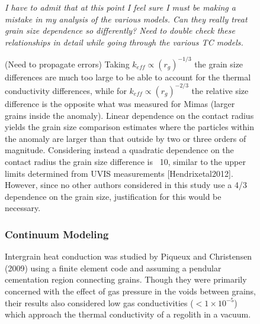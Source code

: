 \documentclass[11pt]{article} %
\begin{document}
\begin{figure}[ht]
	\emph{I have to admit that at this point I feel sure I must be making a mistake in my analysis of the various models. Can they really treat grain size dependence so differently? Need to double check these relationships in detail while going through the various TC models.}
	
	
	
	(Need to propagate errors) Taking $k_{eff} \varpropto (r_{g})^{-1/3}$ the grain size differences are much too large to be able to account for the thermal conductivity differences, while for $k_{eff} \varpropto (r_{g})^{-2/3}$ the relative size difference is the opposite what was measured for Mimas (larger grains inside the anomaly). Linear dependence on the contact radius yields the grain size comparison estimates where the particles within the anomaly are larger than that outside by two or three orders of magnitude. Considering instead a quadratic dependence on the contact radius the grain size difference is ~10, similar to the upper limits determined from UVIS measurements [Hendrixetal2012]. However, since no other authors considered in this study use a 4/3 dependence on the grain size, justification for this would be necessary. %

\subsubsection{Continuum Modeling}
	 Intergrain heat conduction was studied by Piqueux and Christensen (2009) using a finite element code and assuming a pendular cementation region connecting grains. Though they were primarily concerned with the effect of gas pressure in the voids between grains, their results also considered low gas conductivities ($<1 \times10^{-5}$) which approach the thermal conductivity of a regolith in a vacuum.
	

\end{figure}
\end{document}
